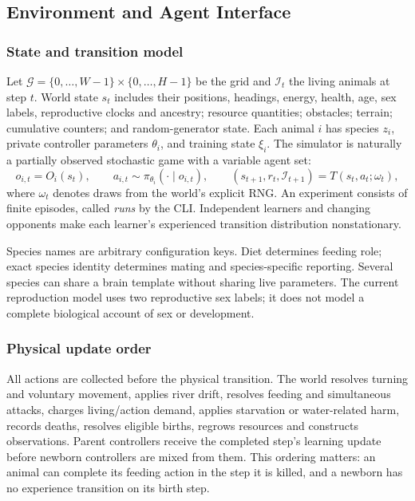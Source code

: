 \subsection{Environment and Agent Interface}\label{sec:environment}
\subsubsection{State and transition model}
Let $\mathcal{G}=\{0,\ldots,W-1\}\times\{0,\ldots,H-1\}$ be the grid and
$\mathcal{I}_t$ the living animals at step $t$. World state $s_t$ includes their
positions, headings, energy, health, age, sex labels, reproductive clocks and
ancestry; resource quantities; obstacles; terrain; cumulative counters; and
random-generator state. Each animal $i$ has species $z_i$, private controller
parameters $\theta_i$, and training state $\xi_i$. The simulator is naturally a
partially observed stochastic game with a variable agent set:
\begin{equation}
 o_{i,t}=O_i(s_t),\qquad a_{i,t}\sim\pi_{\theta_i}(\cdot\mid o_{i,t}),\qquad
 (s_{t+1},r_t,\mathcal{I}_{t+1})=T(s_t,a_t;\omega_t),
\end{equation}
where $\omega_t$ denotes draws from the world's explicit RNG. An experiment
consists of finite episodes, called \emph{runs} by the CLI. Independent learners
and changing opponents make each learner's experienced transition distribution
nonstationary.

Species names are arbitrary configuration keys. Diet determines feeding role;
exact species identity determines mating and species-specific reporting.
Several species can share a brain template without sharing live parameters.
The current reproduction model uses two reproductive sex labels; it does not
model a complete biological account of sex or development.

\subsubsection{Physical update order}
All actions are collected before the physical transition. The world resolves
turning and voluntary movement, applies river drift, resolves feeding and
simultaneous attacks, charges living/action demand, applies starvation or
water-related harm, records deaths, resolves eligible births, regrows resources
and constructs observations. Parent controllers receive the completed step's
learning update before newborn controllers are mixed from them. This ordering
matters: an animal can complete its feeding action in the step it is killed,
and a newborn has no experience transition on its birth step.

